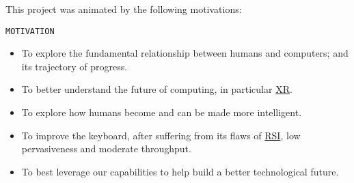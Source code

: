 \documentclass[logo,bsc,singlespacing,parskip]{infthesis}
\begin{document}
This project was animated by the following motivations:

\begin{mdframed}
\begin{description}
\item[{\texttt{MOTIVATION}}] 
\end{description}


\begin{itemize}
\item To explore the fundamental relationship between humans and computers; and its trajectory of progress.

\item To better understand the future of computing, in particular \hyperref[org1d567af]{XR}.

\item To explore how humans become and can be made more intelligent.

\item To improve the keyboard, after suffering from its flaws of \hyperref[orgdb95c62]{RSI}, low pervasiveness and moderate throughput.

\item To best leverage our capabilities to help build a better technological future.
\end{itemize}
\end{mdframed}
\end{document}
